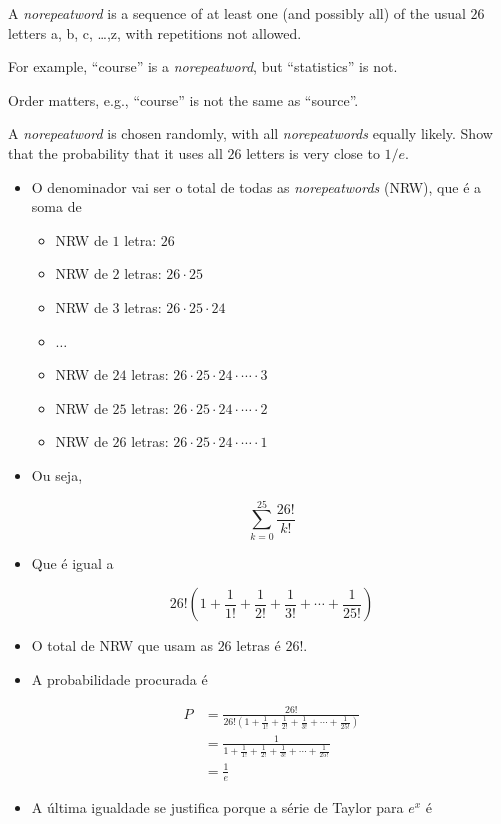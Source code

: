 \documentclass[
  11pt]{report}
\providecommand{\tightlist}{%
  \setlength{\itemsep}{0pt}\setlength{\parskip}{0pt}}
\begin{document}
\begin{rmdbox}
A \emph{norepeatword} is a sequence of at least one (and possibly all) of the usual $26$ letters a, b, c, \ldots,z, with repetitions not allowed.

For example, ``course'' is a \emph{norepeatword}, but ``statistics'' is not.

Order matters, e.g., ``course'' is not the same as ``source''.

A \emph{norepeatword} is chosen randomly, with all \emph{norepeatwords} equally likely. Show that the probability that it uses all $26$ letters is very close to $1/e$.

\end{rmdbox}

\begin{itemize}
\item
  O denominador vai ser o total de todas as \emph{norepeatwords} (NRW), que é a soma de

  \begin{itemize}
  \tightlist
  \item
    NRW de $1$ letra: $26$
  \item
    NRW de $2$ letras: $26 \cdot 25$
  \item
    NRW de $3$ letras: $26 \cdot 25 \cdot 24$
  \item
    $\dots$
  \item
    NRW de $24$ letras: $26 \cdot 25 \cdot 24 \cdot \cdots \cdot 3$
  \item
    NRW de $25$ letras: $26 \cdot 25 \cdot 24 \cdot \cdots \cdot 2$
  \item
    NRW de $26$ letras: $26 \cdot 25 \cdot 24 \cdot \cdots \cdot 1$
  \end{itemize}
\item
  Ou seja,

  \[
  \sum_{k=0}^{25} \frac{26!}{k!}
  \]
\item
  Que é igual a

  \[
  26! 
  \left( 
  1 + \frac{1}{1!} + \frac{1}{2!} + \frac{1}{3!} + \cdots + \frac{1}{25!} 
  \right)
  \]
\item
  O total de NRW que usam as $26$ letras é $26!$.
\item
  A probabilidade procurada é

  \[
  \begin{aligned}
  P 
  &= 
  \frac{26!}{
  26! 
  \left( 
  1 + \frac{1}{1!} + \frac{1}{2!} + \frac{1}{3!} + \cdots + \frac{1}{25!} 
  \right)
  } \\
  &=
  \frac{1}{
  1 + \frac{1}{1!} + \frac{1}{2!} + \frac{1}{3!} + \cdots + \frac{1}{25!} 
  } \\
  &= \frac1e
  \end{aligned}
  \]
\item
  A última igualdade se justifica porque a série de Taylor para $e^x$ é


\end{itemize}
\end{document}
